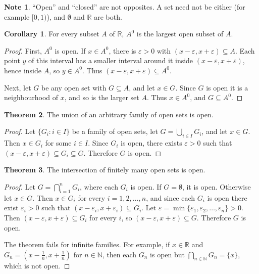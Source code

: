 \documentclass[11pt,a4paper]{article}
\numberwithin{equation}{section}
\theoremstyle{definition}
\newtheorem{thm}{Theorem}[subsection]
\newtheorem{coro}[thm]{Corollary}
\newtheorem*{note}{Note}
\begin{document}
\begin{note}
``Open'' and ``closed'' are not opposites. A set need not be either (for example $[0,1)$), and $\emptyset$ and $\mathbb{R}$ are both.
\end{note}


\begin{coro}
For every subset $A$ of $\mathbb{R}$, $A^0$ is the largest open subset of $A$.
\end{coro}

\begin{proof}
First, $A^0$ is open. If $x\in A^0$, there is $\varepsilon>0$ with $(x-\varepsilon,x+\varepsilon)\subseteq A$. Each point $y$ of this interval has a smaller interval around it inside $(x-\varepsilon,x+\varepsilon)$, hence inside $A$, so $y\in A^0$. Thus $(x-\varepsilon,x+\varepsilon)\subseteq A^0$.

Next, let $G$ be any open set with $G\subseteq A$, and let $x\in G$. Since $G$ is open it is a neighbourhood of $x$, and so is the larger set $A$. Thus $x\in A^0$, and $G\subseteq A^0$.
\end{proof}


\begin{thm}
The union of an arbitrary family of open sets is open.
\end{thm}

\begin{proof}
Let $\{G_i: i\in I\}$ be a family of open sets, let $G = \bigcup_{i\in I}G_i$, and let $x \in G$. Then $x \in G_i$ for some $i\in I$. Since $G_i$ is open, there exists $\varepsilon > 0$ such that $(x - \varepsilon, x + \varepsilon) \subseteq G_i \subseteq G$. Therefore $G$ is open.
\end{proof}


\begin{thm}
The intersection of finitely many open sets is open.
\end{thm}

\begin{proof}
Let $G = \bigcap^{n}_{i = 1} G_i$, where each $G_i$ is open. If $G= \emptyset$, it is open. Otherwise let $x \in G$. Then $x \in G_i$ for every $i = 1,2,\dots,n$, and since each $G_i$ is open there exist $\varepsilon_i > 0$ such that $( x - \varepsilon_i, x + \varepsilon_i) \subseteq G_i$. Let $\varepsilon = \min \{ \varepsilon_1, \varepsilon_2,\dots, \varepsilon_n\}>0$. Then $(x - \varepsilon, x + \varepsilon) \subseteq G_i$ for every $i$, so $(x - \varepsilon, x + \varepsilon) \subseteq G$. Therefore $G$ is open.

The theorem fails for infinite families. For example, if $x\in\mathbb{R}$ and $G_n = \left(x - \frac{1}{n}, x + \frac{1}{n}\right)$ for $n\in \mathbb{N}$, then each $G_n$ is open but $\bigcap_{n\in \mathbb{N}} G_n = \{x\}$, which is not open.
\end{proof}
\end{document}
